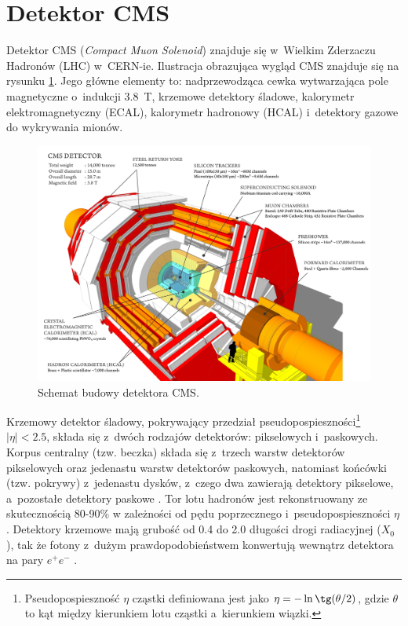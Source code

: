 \documentclass{pracalicmgr}
\begin{document}
    \section{Detektor CMS}
	Detektor CMS (\textit{Compact Muon Solenoid}) znajduje się w~Wielkim Zderzaczu Hadronów (LHC) \cite{adolphi2008cms} w~CERN-ie. Ilustracja obrazująca wygląd CMS znajduje się na rysunku \ref{fig:cms}. Jego główne elementy to: nadprzewodząca cewka wytwarzająca pole magnetyczne o~indukcji 3.8~T, krzemowe detektory śladowe, kalorymetr elektromagnetyczny (ECAL), kalorymetr hadronowy (HCAL) i~detektory gazowe do wykrywania mionów. 
	
	\begin{figure}[H]
	\centering
	\includegraphics[width=1\textwidth]{cms.png}
	\caption{Schemat budowy detektora CMS.}
	\label{fig:cms}
	\end{figure}
	
	Krzemowy detektor śladowy, pokrywający przedział pseudopospieszności\footnote{Pseudopospieszność $\eta$ cząstki definiowana jest jako $\eta = -\ln \tg(\theta/2)$, gdzie $\theta$ to kąt między kierunkiem lotu cząstki a~kierunkiem wiązki.} $|\eta| < 2.5$, składa się z~dwóch rodzajów detektorów: pikselowych i~paskowych. Korpus centralny (tzw. beczka) składa się z~trzech warstw detektorów pikselowych oraz jedenastu warstw detektorów paskowych, natomiast końcówki (tzw. pokrywy) z~jedenastu dysków, z~czego dwa zawierają detektory pikselowe, a~pozostałe detektory paskowe \cite{cms_technical}. Tor lotu hadronów jest rekonstruowany ze skutecznością 80-90\% w zależności od pędu poprzecznego i~pseudopospieszności $\eta$. Detektory krzemowe mają grubość od 0.4 do 2.0 długości drogi radiacyjnej ($X_0$), tak że fotony z~dużym prawdopodobieństwem konwertują wewnątrz detektora na pary $e^+e^-$ \cite{tauid13}.
	
\end{document}
